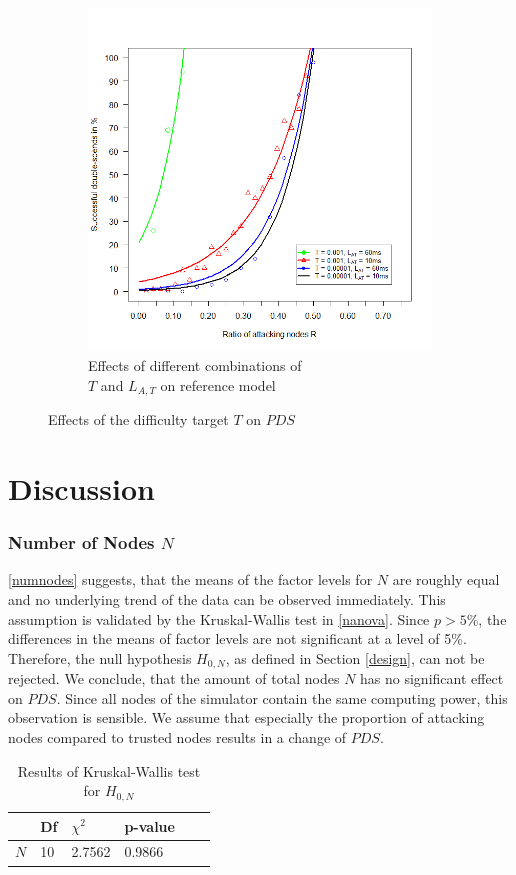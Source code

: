 \documentclass[a4paper,12pt,twoside]{report}
\begin{document}
\begin{figure}
\begin{subfigure}{.5\textwidth}
  \includegraphics[width=\linewidth]{Experiments/Difficulty/diffrat.png}
  \caption{Effects of different combinations of \\ $T$ and $L_{A,T}$ on reference model}
  \label{diff:b}
\end{subfigure}
\caption{Effects of the difficulty target $T$ on $PDS$}
\label{diff}
\end{figure}

\section{Discussion}
\subsubsection{Number of Nodes $N$}
\autoref{numnodes} suggests, that the means of the factor levels for $N$ are roughly equal and no underlying trend of the data can be observed immediately. This assumption is validated by the Kruskal-Wallis test in \autoref{nanova}. Since $p > 5\%$, the differences in the means of factor levels are not significant at a level of 5\%. Therefore, the null hypothesis $H_{0,N}$, as defined in Section \ref{design}, can not be rejected. We conclude, that the amount of total nodes $N$ has no significant effect on $PDS$. Since all nodes of the simulator contain the same computing power, this observation is sensible. We assume that especially the proportion of attacking nodes compared to trusted nodes results in a change of $PDS$.
\begin{table}[hb]
\centering
\begin{tabular}{|l|l|l|l|l|l|} \hline
& Df & $\chi^{2}$ & p-value \\ \hline
$N$ & 10 &  2.7562 & 0.9866 \\ \hline
\end{tabular}
\caption{Results of Kruskal-Wallis test for $H_{0,N}$}
\label{nanova}
\end{table}
\end{document}
